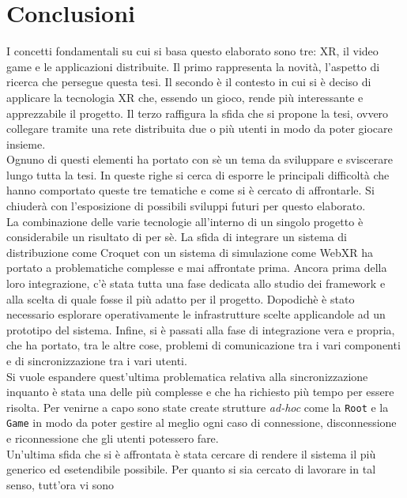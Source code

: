 \chapter*{Conclusioni}
I concetti fondamentali su cui si basa questo elaborato sono tre: XR, il video game e le applicazioni distribuite. Il primo rappresenta la novità, l'aspetto di ricerca che persegue questa
tesi. Il secondo è il contesto in cui si è deciso di applicare la tecnologia XR che, essendo un gioco, rende più interessante e apprezzabile il progetto. Il terzo raffigura 
la sfida che si propone la tesi, ovvero collegare tramite una rete distribuita due o più utenti in modo da poter giocare insieme.\\
Ognuno di questi elementi ha portato con sè un tema da sviluppare e sviscerare lungo tutta la tesi. In queste righe si cerca di esporre le principali difficoltà che hanno comportato queste
tre tematiche e come si è cercato di affrontarle. Si chiuderà con l'esposizione di possibili sviluppi futuri per questo elaborato.\\
\newline
La combinazione delle varie tecnologie all'interno di un singolo progetto è considerabile un risultato di per sè. La sfida di integrare un sistema di distribuzione
come Croquet con un sistema di simulazione come WebXR ha portato a problematiche complesse e mai affrontate prima. Ancora prima della loro integrazione, c'è stata tutta una fase 
dedicata allo studio dei framework e alla scelta di quale fosse il più adatto per il progetto. Dopodichè è stato necessario esplorare operativamente le infrastrutture scelte 
applicandole ad un prototipo del sistema. Infine, si è passati alla fase di integrazione vera e propria, che ha portato, tra le altre cose, problemi di comunicazione tra i vari 
componenti e di sincronizzazione tra i vari utenti.\\
Si vuole espandere quest'ultima problematica relativa alla sincronizzazione inquanto è stata una delle più complesse e che ha richiesto più tempo per essere risolta. Per venirne a 
capo sono state create strutture \textit{ad-hoc} come la \texttt{Root} e la \texttt{Game} in modo da poter gestire al meglio ogni caso di connessione, disconnessione e riconnessione 
che gli utenti potessero fare.\\
Un'ultima sfida che si è affrontata è stata cercare di rendere il sistema il più generico ed esetendibile possibile. Per quanto si sia cercato di lavorare in tal senso, tutt'ora vi sono
